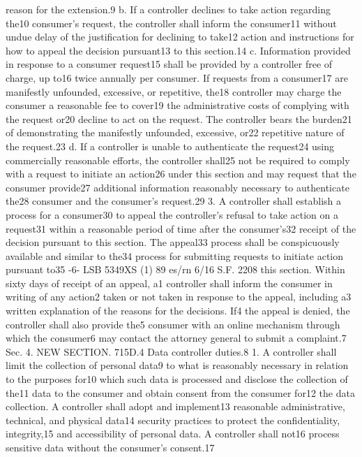 reason for the extension.9
b. If a controller declines to take action regarding the10
consumer’s request, the controller shall inform the consumer11
without undue delay of the justification for declining to take12
action and instructions for how to appeal the decision pursuant13
to this section.14
c. Information provided in response to a consumer request15
shall be provided by a controller free of charge, up to16
twice annually per consumer. If requests from a consumer17
are manifestly unfounded, excessive, or repetitive, the18
controller may charge the consumer a reasonable fee to cover19
the administrative costs of complying with the request or20
decline to act on the request. The controller bears the burden21
of demonstrating the manifestly unfounded, excessive, or22
repetitive nature of the request.23
d. If a controller is unable to authenticate the request24
using commercially reasonable efforts, the controller shall25
not be required to comply with a request to initiate an action26
under this section and may request that the consumer provide27
additional information reasonably necessary to authenticate the28
consumer and the consumer’s request.29
3. A controller shall establish a process for a consumer30
to appeal the controller’s refusal to take action on a request31
within a reasonable period of time after the consumer’s32
receipt of the decision pursuant to this section. The appeal33
process shall be conspicuously available and similar to the34
process for submitting requests to initiate action pursuant to35
-6-
LSB 5349XS (1) 89
es/rn 6/16
S.F. 2208
this section. Within sixty days of receipt of an appeal, a1
controller shall inform the consumer in writing of any action2
taken or not taken in response to the appeal, including a3
written explanation of the reasons for the decisions. If4
the appeal is denied, the controller shall also provide the5
consumer with an online mechanism through which the consumer6
may contact the attorney general to submit a complaint.7
Sec. 4. NEW SECTION. 715D.4 Data controller duties.8
1. A controller shall limit the collection of personal data9
to what is reasonably necessary in relation to the purposes for10
which such data is processed and disclose the collection of the11
data to the consumer and obtain consent from the consumer for12
the data collection. A controller shall adopt and implement13
reasonable administrative, technical, and physical data14
security practices to protect the confidentiality, integrity,15
and accessibility of personal data. A controller shall not16
process sensitive data without the consumer’s consent.17

